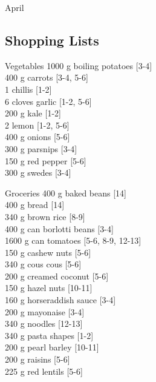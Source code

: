 \begin{menu}{April}
    \subsection*{Shopping Lists}
      \begin{shoppinglist}{Vegetables}
      1000 g boiling potatoes {\scriptsize[3-4]}\\
      400 g carrots {\scriptsize[3-4, 5-6]}\\
      1  chillis {\scriptsize[1-2]}\\
      6 cloves garlic {\scriptsize[1-2, 5-6]}\\
      200 g kale {\scriptsize[1-2]}\\
      2  lemon {\scriptsize[1-2, 5-6]}\\
      400 g onions {\scriptsize[5-6]}\\
      300 g parsnips {\scriptsize[3-4]}\\
      150 g red pepper {\scriptsize[5-6]}\\
      300 g swedes {\scriptsize[3-4]}\\
      \end{shoppinglist}%
      \begin{shoppinglist}{Groceries}
      400 g baked beans {\scriptsize[14]}\\
      400 g bread {\scriptsize[14]}\\
      340 g brown rice {\scriptsize[8-9]}\\
      400 g can borlotti beans {\scriptsize[3-4]}\\
      1600 g can tomatoes {\scriptsize[5-6, 8-9, 12-13]}\\
      150 g cashew nuts {\scriptsize[5-6]}\\
      340 g cous cous {\scriptsize[5-6]}\\
      200 g creamed coconut {\scriptsize[5-6]}\\
      150 g hazel nuts {\scriptsize[10-11]}\\
      160 g horseraddish sauce {\scriptsize[3-4]}\\
      200 g mayonaise {\scriptsize[3-4]}\\
      340 g noodles {\scriptsize[12-13]}\\
      340 g pasta shapes {\scriptsize[1-2]}\\
      200 g pearl barley {\scriptsize[10-11]}\\
      200 g raisins {\scriptsize[5-6]}\\
      225 g red lentils {\scriptsize[5-6]}\\

\end{shoppinglist}
\end{menu}

